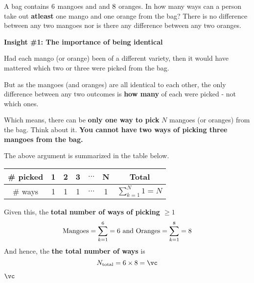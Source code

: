 



\MULTIPLY\va\vb\vc

\question[5] A bag contains $6$ mangoes and and $8$ oranges. 
In how many ways can a person take out \textbf{atleast} one mango and one orange from the bag? 
There is no difference between any two mangoes nor is there any difference between any two oranges.

\watchout

\begin{solution}[\halfpage]
  \textbf{Insight \#1: The importance of being identical}

  Had each mango (or orange) been of a different variety, then it would have mattered 
  which two or three were picked from the bag. 

  But as the mangoes (and oranges) are all identical to each other, the only difference 
  between any two outcomes is \textbf{how many} of each were picked - not which ones.

  Which means, there can be \textbf{only one way to pick} $N$ mangoes (or oranges) from the bag.
  Think about it. \textbf{You cannot have two ways of picking three mangoes from the bag.}

  The above argument is summarized in the table below. 

  \begin{tabular}{c c c c c c c}
    \toprule
    \# picked & 1 & 2 & 3 & $\ldots$ & N & Total \\
    \midrule 
    \# ways  & 1 & 1 & 1 & $\ldots$ & 1 & $\sum_{k=1}^N 1 = N$ \\
    \bottomrule
  \end{tabular}

  Given this, the \textbf{total number of ways of picking $\geq 1$} 
  \[ \text{Mangoes} = \sum_{k=1}^{6} = 6\text{ and Oranges} = \sum_{k=1}^8 = 8 \] 
  And hence, the \textbf{the total number of ways} is 
  \[ N_{\text{total}} = \va\times\vb = \vc \] 
\end{solution}

\ifprintanswers\begin{codex}$\vc$\end{codex}\fi
